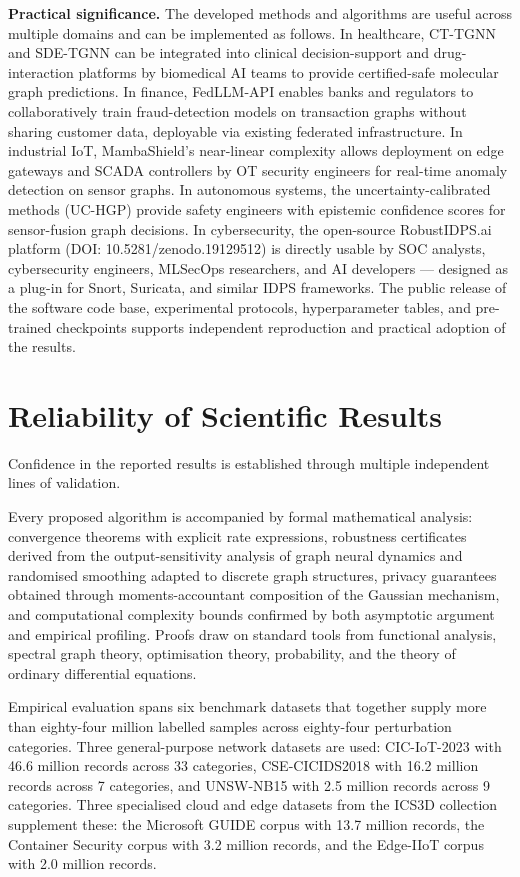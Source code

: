 \textbf{Practical significance.} The developed methods and algorithms are useful across multiple domains and can be implemented as follows. In healthcare, CT-TGNN and SDE-TGNN can be integrated into clinical decision-support and drug-interaction platforms by biomedical AI teams to provide certified-safe molecular graph predictions. In finance, FedLLM-API enables banks and regulators to collaboratively train fraud-detection models on transaction graphs without sharing customer data, deployable via existing federated infrastructure. In industrial IoT, MambaShield's near-linear complexity allows deployment on edge gateways and SCADA controllers by OT security engineers for real-time anomaly detection on sensor graphs. In autonomous systems, the uncertainty-calibrated methods (UC-HGP) provide safety engineers with epistemic confidence scores for sensor-fusion graph decisions. In cybersecurity, the open-source RobustIDPS.ai platform (DOI: 10.5281/zenodo.19129512) is directly usable by SOC analysts, cybersecurity engineers, MLSecOps researchers, and AI developers --- designed as a plug-in for Snort, Suricata, and similar IDPS frameworks. The public release of the software code base, experimental protocols, hyperparameter tables, and pre-trained checkpoints supports independent reproduction and practical adoption of the results.


\section*{Reliability of Scientific Results}

Confidence in the reported results is established through multiple independent lines of validation.

Every proposed algorithm is accompanied by formal mathematical analysis: convergence theorems with explicit rate expressions, robustness certificates derived from the output-sensitivity analysis of graph neural dynamics and randomised smoothing adapted to discrete graph structures, privacy guarantees obtained through moments-accountant composition of the Gaussian mechanism, and computational complexity bounds confirmed by both asymptotic argument and empirical profiling. Proofs draw on standard tools from functional analysis, spectral graph theory, optimisation theory, probability, and the theory of ordinary differential equations.

Empirical evaluation spans six benchmark datasets that together supply more than eighty-four million labelled samples across eighty-four perturbation categories. Three general-purpose network datasets are used: CIC-IoT-2023 with 46.6 million records across 33 categories, CSE-CICIDS2018 with 16.2 million records across 7 categories, and UNSW-NB15 with 2.5 million records across 9 categories. Three specialised cloud and edge datasets from the ICS3D collection supplement these: the Microsoft GUIDE corpus with 13.7 million records, the Container Security corpus with 3.2 million records, and the Edge-IIoT corpus with 2.0 million records.

